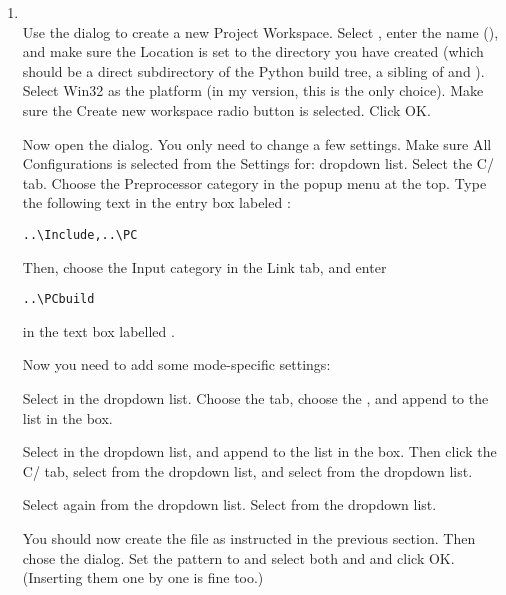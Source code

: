 \begin{enumerate}
  \item
  \\
    Use the  dialog to
    create a new Project Workspace.  Select , enter the name (), and make sure the
    Location is set to the  directory you have created
    (which should be a direct subdirectory of the Python build tree, a
    sibling of  and ).  Select Win32 as the
    platform (in my version, this is the only choice).  Make sure the
    Create new workspace radio button is selected.  Click OK.

    Now open the  dialog.  You
    only need to change a few settings.  Make sure All Configurations
    is selected from the Settings for: dropdown list.  Select the
    C/\Cpp{} tab.  Choose the Preprocessor category in the popup menu
    at the top.  Type the following text in the entry box labeled
    :

\begin{verbatim}
..\Include,..\PC
\end{verbatim}

    Then, choose the Input category in the Link tab, and enter

\begin{verbatim}
..\PCbuild
\end{verbatim}

    in the text box labelled .

    Now you need to add some mode-specific settings:

    Select  in the 
    dropdown list.  Choose the  tab, choose the
    , and append  to the
    list in the  box.

    Select  in the 
    dropdown list, and append  to the list in the
     box.  Then click the C/\Cpp{}
    tab, select  from the
     dropdown list, and select  from the  dropdown
    list.

    Select  again from the  dropdown list.  Select  from the
     dropdown list.

    You should now create the file  as instructed in the
    previous section.  Then chose the  dialog.  Set the pattern to  and select
    both  and  and click OK.  (Inserting
    them one by one is fine too.)
\end{enumerate}


